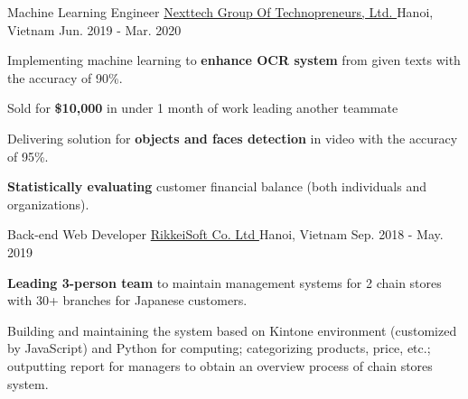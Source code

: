 \begin{cventries}
    \cventry
            {Machine Learning Engineer} %
            {\href{https://nexttech.asia/}{Nexttech Group Of Technopreneurs, Ltd. }} %
            {Hanoi, Vietnam} %
            {Jun. 2019 - Mar. 2020} %
            {
                \begin{cvitems}
                    \item {Implementing machine learning to \textbf{enhance OCR system} from given texts with the accuracy of 90\%. }
                    \item Sold for \textbf{\$10,000} in under 1 month of work leading another teammate
                    \item {Delivering solution for \textbf{objects and faces detection} in video with the accuracy of 95\%. }
                    \item {\textbf{Statistically evaluating} customer financial balance (both individuals and organizations). }
                \end{cvitems}
            }
    \vspace{4mm}

    \cventry
        {Back-end Web Developer}
        {\href{https://rikkeisoft.com/en/}{RikkeiSoft Co. Ltd }}
        {Hanoi, Vietnam}
        {Sep. 2018 - May. 2019}
        {
            \begin{cvitems}
                \item \textbf{Leading 3-person team} to maintain management systems for 2 chain stores with 30+ branches for Japanese customers.
                \item Building and maintaining the system based on Kintone environment (customized by JavaScript) and Python for computing; categorizing products, price, etc.; outputting report for managers to obtain an overview process of chain stores system.
            \end{cvitems}
        }
    \vspace{4mm}

\end{cventries}
